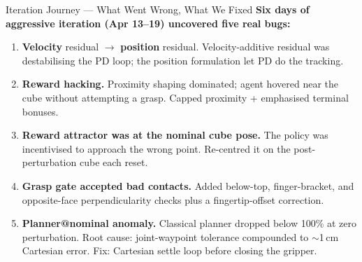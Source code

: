 \documentclass[aspectratio=169, 10pt]{beamer}
\begin{document}
\begin{frame}{Iteration Journey --- What Went Wrong, What We Fixed}
  \small
  \textbf{Six days of aggressive iteration (Apr 13--19) uncovered five real bugs:}

  \vspace{0.3em}
  \begin{enumerate}
    \item \textbf{Velocity} residual $\to$ \textbf{position} residual.
          Velocity-additive residual was destabilising the PD loop; the position
          formulation let PD do the tracking.
    \item \textbf{Reward hacking.} Proximity shaping dominated; agent hovered
          near the cube without attempting a grasp. Capped proximity +
          emphasised terminal bonuses.
    \item \textbf{Reward attractor was at the nominal cube pose.} The policy
          was incentivised to approach the wrong point. Re-centred it on the
          post-perturbation cube each reset.
    \item \textbf{Grasp gate accepted bad contacts.}
          Added below-top, finger-bracket, and opposite-face perpendicularity
          checks plus a fingertip-offset correction.
    \item \textbf{Planner@nominal anomaly.} Classical planner dropped below
          100\% at zero perturbation. Root cause: joint-waypoint tolerance
          compounded to $\sim$1\,cm Cartesian error. Fix: Cartesian settle loop
          before closing the gripper.
  \end{enumerate}
\end{frame}

\end{document}
